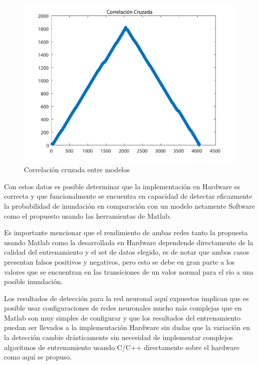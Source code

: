 \begin{figure}[H]
	\centering
		\includegraphics[scale=0.6]{./Figures/xcorrANN}
	\caption{Correlación cruzada entre modelos}
	\label{fig:xcorr}
\end{figure}

Con estos datos es posible determinar que la implementación en Hardware es correcta y que funcionalmente se encuentra en capacidad de detectar eficazmente la probabilidad de inundación en comparación con un modelo netamente Software como el propuesto usando las herramientas de Matlab.

Es importante mencionar que el rendimiento de ambas redes tanto la propuesta usando Matlab como la desarrollada en Hardware dependende directamente de la calidad del entrenamiento y el set de datos elegido, es de notar que ambos casos presentan falsos positivos y negativos, pero esto se debe en gran parte a los valores que se encuentran en las transiciones de un valor normal para el río a una posible inundación.

Los resultados de detección para la red neuronal aquí expuestos implican que es posible usar configuraciones de redes neuronales mucho más complejas que en Matlab son muy simples de configurar y que los resultados del entrenamiento puedan ser llevados a la implementación Hardware sin dudas que la variación en la detección cambie drásticamente sin necesidad de implementar complejos algoritmos de entrenamiento usando C/C++ directamente sobre el hardware como aquí se propuso.
